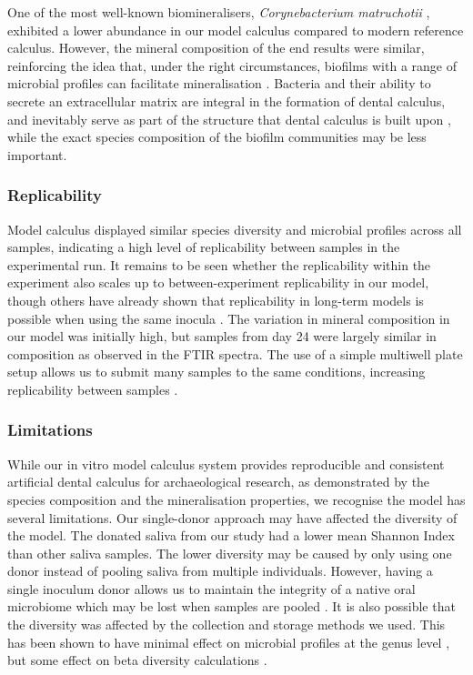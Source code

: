 \documentclass[10pt,a4paper]{article}
\begin{document}
One of the most well-known biomineralisers, \emph{Corynebacterium
matruchotii}
\citep{enneverCharacterizationBacterionema1978, takazoeCalciumHydroxyapatite1970},
exhibited a lower abundance in our model calculus compared to modern
reference calculus. However, the mineral composition of the end results
were similar, reinforcing the idea that, under the right circumstances,
biofilms with a range of microbial profiles can facilitate
mineralisation \citep{moorerCalcificationCariogenic1993}. Bacteria and
their ability to secrete an extracellular matrix are integral in the
formation of dental calculus, and inevitably serve as part of the
structure that dental calculus is built upon
\citep{rohanizadehUltrastructuralStudy2005}, while the exact species
composition of the biofilm communities may be less important.

\subsubsection*{Replicability}\label{replicability}

Model calculus displayed similar species diversity and microbial
profiles across all samples, indicating a high level of replicability
between samples in the experimental run. It remains to be seen whether
the replicability within the experiment also scales up to
between-experiment replicability in our model, though others have
already shown that replicability in long-term models is possible when
using the same inocula \citep{velskoConsistentReproducible2018}. The
variation in mineral composition in our model was initially high, but
samples from day 24 were largely similar in composition as observed in
the FTIR spectra. The use of a simple multiwell plate setup allows us to
submit many samples to the same conditions, increasing replicability
between samples \citep{extercateAAA2010}.

\subsubsection*{Limitations}\label{limitations}

While our in vitro model calculus system provides reproducible and
consistent artificial dental calculus for archaeological research, as
demonstrated by the species composition and the mineralisation
properties, we recognise the model has several limitations. Our
single-donor approach may have affected the diversity of the model. The
donated saliva from our study had a lower mean Shannon Index than other
saliva samples. The lower diversity may be caused by only using one
donor instead of pooling saliva from multiple individuals. However,
having a single inoculum donor allows us to maintain the integrity of a
native oral microbiome which may be lost when samples are pooled
\citep{edlundBiofilmModel2013}. It is also possible that the diversity
was affected by the collection and storage methods we used. This has
been shown to have minimal effect on microbial profiles at the genus
level \citep{limSalivaMicrobiome2017}, but some effect on beta diversity
calculations \citep{omoriComparativeEvaluation2021}.
\end{document}
